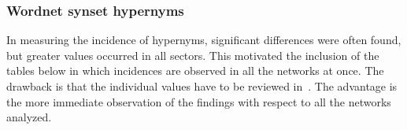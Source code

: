 																																																																																																																																																																																																																																																																																																																																												\subsubsection{Wordnet synset hypernyms}\label{subsec:wn1}
																																																																																																																																																																																																																																																																																																																																												In measuring the incidence of hypernyms, significant differences were often found, but greater values
																																																																																																																																																																																																																																																																																																																																												occurred in all sectors.
																																																																																																																																																																																																																																																																																																																																												This motivated the inclusion of the tables below in which incidences are observed in all the networks at once.
																																																																																																																																																																																																																																																																																																																																												The drawback is that the individual values have to be reviewed in~\cite{textTables}.
																																																																																																																																																																																																																																																																																																																																												The advantage is the more immediate observation of the findings with respect to all the networks analyzed.
